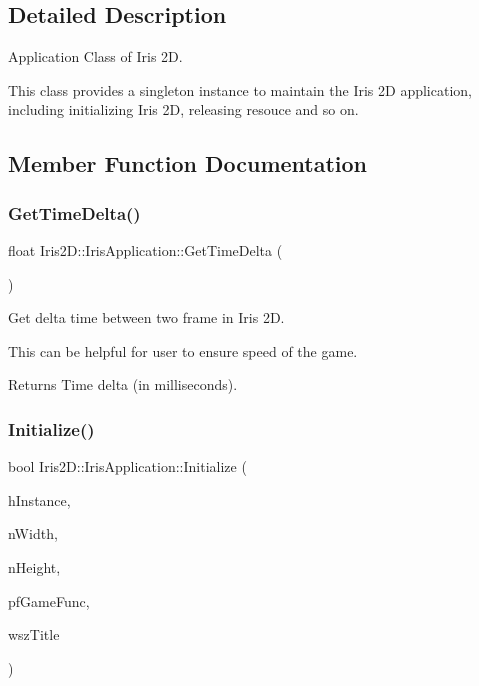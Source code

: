 \subsection{Detailed Description}
Application Class of Iris 2D. 

This class provides a singleton instance to maintain the Iris 2D application, including initializing Iris 2D, releasing resouce and so on. 

\subsection{Member Function Documentation}
\mbox{\label{class_iris2_d_1_1_iris_application_a3b8f4de1902aeda08acbe243aad34f15}} 
\subsubsection{\texorpdfstring{Get\+Time\+Delta()}{GetTimeDelta()}}
{\footnotesize\ttfamily float Iris2\+D\+::\+Iris\+Application\+::\+Get\+Time\+Delta (\begin{DoxyParamCaption}{ }\end{DoxyParamCaption})}



Get delta time between two frame in Iris 2D. 

This can be helpful for user to ensure speed of the game. \begin{DoxyReturn}{Returns}
Time delta (in milliseconds). 
\end{DoxyReturn}
\mbox{\label{class_iris2_d_1_1_iris_application_a84f3ddebb3a3ffb0c172bd41fb952e1a}} 
\subsubsection{\texorpdfstring{Initialize()}{Initialize()}\hspace{0.1cm}{\footnotesize\ttfamily [1/2]}}
{\footnotesize\ttfamily bool Iris2\+D\+::\+Iris\+Application\+::\+Initialize (\begin{DoxyParamCaption}\item[{H\+I\+N\+S\+T\+A\+N\+CE}]{h\+Instance,  }\item[{unsigned int}]{n\+Width,  }\item[{unsigned int}]{n\+Height,  }\item[{\hyperlink{class_iris2_d_1_1_iris_application_ac74720e6cd3a1968f73e92ea99675884}{Game\+Func}}]{pf\+Game\+Func,  }\item[{const std\+::wstring \&}]{wsz\+Title }\end{DoxyParamCaption})}



